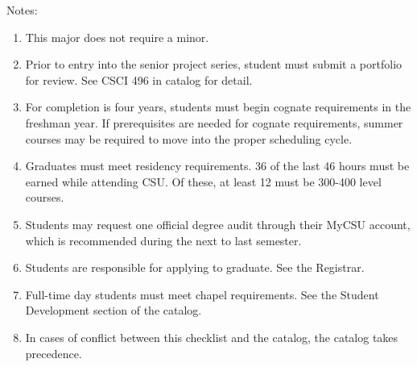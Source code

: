 Notes:%
\begin{enumerate}\footnotesize
	\item This major does not require a minor.
	\item Prior to entry into the senior project series, student must submit a portfolio for review. See CSCI 496 in catalog for detail.
	\item For completion is four years, students must begin cognate requirements in the freshman year. If prerequisites are needed for cognate requirements, summer courses may be required to move into the proper scheduling cycle.
	\item Graduates must meet residency requirements. 36 of the last 46 hours must be earned while attending CSU. Of these, at least 12 must be 300-400 level courses.
	\item Students may request one official degree audit through their MyCSU account, which is recommended during the next to last semester.
	\item Students are responsible for applying to graduate. See the Registrar.
	\item Full-time day students must meet chapel requirements. See the Student Development section of the catalog.
	\item In cases of conflict between this checklist and the catalog, the catalog takes precedence.
\end{enumerate}
